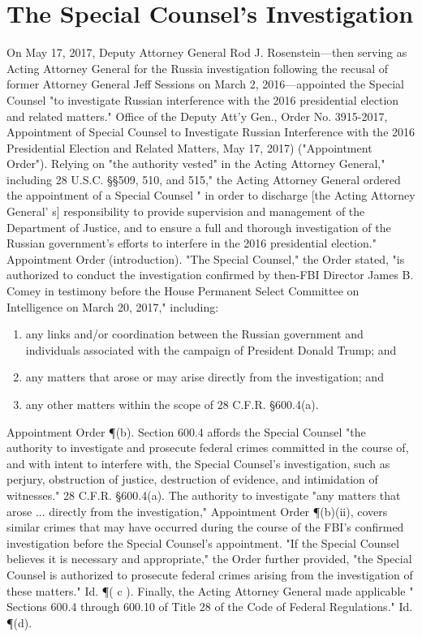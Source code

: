 \section{The Special Counsel's Investigation}

On May 17, 2017, Deputy Attorney General Rod J. Rosenstein---then serving as Acting Attorney General for the Russia investigation following the recusal of former Attorney General Jeff Sessions on March 2, 2016---appointed the Special Counsel "to investigate Russian interference with the 2016 presidential election and related matters."
Office of the Deputy Att'y Gen., Order No. 3915-2017, Appointment of Special Counsel to Investigate Russian Interference with the 2016 Presidential Election and Related Matters, May 17, 2017) ("Appointment Order").
Relying on "the authority vested" in the Acting Attorney General," including 28 U.S.C. \S\S 509, 510, and 515," the Acting Attorney General ordered the appointment of a Special Counsel " in order to discharge [the Acting Attorney General' s] responsibility to provide supervision and management of the Department of Justice, and to ensure a full and thorough investigation of the Russian government's efforts to interfere in the 2016 presidential election." Appointment Order (introduction).
"The Special Counsel," the Order stated, "is authorized to conduct the investigation confirmed by then-FBI Director James B. Comey in testimony before the House Permanent Select Committee on Intelligence on March 20, 2017," including:

\begin{enumerate}[i]
  \item any links and/or coordination between the Russian government and individuals associated with the campaign of President Donald Trump; and
  \item any matters that arose or may arise directly from the investigation; and
  \item any other matters within the scope of 28 C.F.R. \S 600.4(a).
\end{enumerate}

Appointment Order \P (b). Section 600.4 affords the Special Counsel "the authority to investigate and prosecute federal crimes committed in the course of, and with intent to interfere with, the Special Counsel's investigation, such as perjury, obstruction of justice, destruction of evidence, and intimidation of witnesses." 28 C.F.R. \S 600.4(a).
The authority to investigate "any matters that arose ... directly from the investigation," Appointment Order \P (b)(ii), covers similar crimes that may have occurred during the course of the FBI's confirmed investigation before the Special Counsel's appointment.
"If the Special Counsel believes it is necessary and appropriate," the Order further provided, "the Special Counsel is authorized to prosecute federal crimes arising from the investigation of these matters." Id. \P ( c ).
Finally, the Acting Attorney General made applicable " Sections 600.4 through 600.10 of Title 28 of the Code of Federal Regulations." Id. \P (d).

